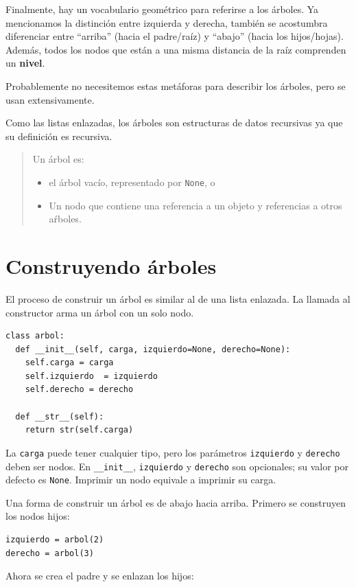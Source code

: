Finalmente, hay un vocabulario geométrico para referirse a los árboles.
Ya mencionamos la distinción entre izquierda y derecha, también se
acostumbra diferenciar entre ``arriba'' (hacia el padre/raíz) y
``abajo'' (hacia los hijos/hojas). Además, todos los nodos que están
a una misma distancia de la raíz comprenden un \textbf{nivel}.

Probablemente no necesitemos estas metáforas para describir los árboles,
pero se usan extensivamente.

Como las listas enlazadas, los árboles son estructuras de datos recursivas
ya que su definición es recursiva.

 
\begin{quote}
Un árbol es:

\begin{itemize}
\item el árbol vacío, representado por \texttt{None}, o
\item Un nodo que contiene una referencia a un objeto y referencias a otros
aŕboles.
\end{itemize}
\end{quote}

\section{Construyendo árboles}

El proceso de construir un árbol es similar al de una lista enlazada.
La llamada al constructor arma un árbol con un solo nodo.

\beforeverb 
\begin{verbatim}
class arbol:
  def __init__(self, carga, izquierdo=None, derecho=None):
    self.carga = carga
    self.izquierdo  = izquierdo
    self.derecho = derecho

  def __str__(self):
    return str(self.carga)
\end{verbatim}
\afterverb La \texttt{carga} puede tener cualquier tipo, pero los
parámetros \texttt{izquierdo} y \texttt{derecho} deben ser nodos.
En \texttt{\_\_init\_\_}, \texttt{izquierdo} y \texttt{derecho} son
opcionales; su valor por defecto es \texttt{None}. Imprimir un nodo
equivale a imprimir su carga.

Una forma de construir un árbol es de abajo hacia arriba. Primero
se construyen los nodos hijos:

\beforeverb 
\begin{verbatim}
izquierdo = arbol(2)
derecho = arbol(3)
\end{verbatim}
\afterverb Ahora se crea el padre y se enlazan los hijos:

